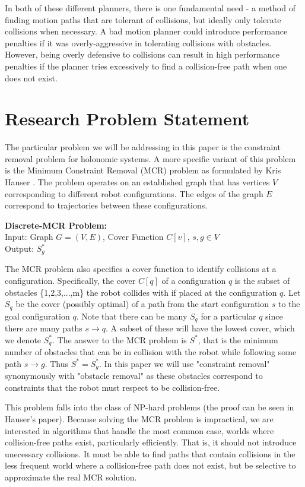In both of these different planners, there is one fundamental need - a method of finding motion paths that are tolerant of collisions, but ideally only tolerate collisions when necessary. A bad motion planner could introduce performance penalties if it was overly-aggressive in tolerating collisions with obstacles. However, being overly defensive to collisions can result in high performance penalties if the planner tries excessively to find a collision-free path when one does not exist. 

\section{Research Problem Statement} \label{intro:statement}
The particular problem we will be addressing in this paper is the constraint removal problem for holonomic systems. A more specific variant of this problem is the Minimum Constraint Removal (MCR) problem as formulated by Kris Hauser \cite{hauser:mcr}. The problem operates on an established graph that has vertices $V$ corresponding to different robot configurations. The edges of the graph $E$ correspond to trajectories between these configurations. 

\begin{mdframed}
{\bf{Discrete-MCR Problem:}}\\
Input: Graph $G = (V,E)$, Cover Function $C[v]$, $s,g \in V$  \\
Output: $S^{*}_g$
\end{mdframed}

The MCR problem also specifies a cover function to identify collisions at a configuration. Specifically, the cover $C[q]$ of a configuration $q$ is the subset of obstacles \{1,2,3,...,m\} the robot collides with if placed at the configuration $q$. Let $S_q$ be the cover (possibly optimal) of a path from the start configuration $s$ to the goal configuration $q$. Note that there can be many $S_q$ for a particular $q$ since there are many paths $s \rightarrow q$. A subset of these will have the lowest cover, which we denote $S^{*}_q$. The answer to the MCR problem is $S^{*}$, that is the minimum number of obstacles that can be in collision with the robot while following some path $s \rightarrow g$. Thus $S^{*} = S^{*}_g$. In this paper we will use "constraint removal" synonymously with "obstacle removal" as these obstacles correspond to constraints that the robot must respect to be collision-free.

This problem falls into the class of NP-hard problems (the proof can be seen in Hauser's paper). Because solving the MCR problem is impractical, we are interested in algorithms that handle the most common case, worlds where collision-free paths exist, particularly efficiently. That is, it should not introduce unecessary collisions. It must be able to find paths that contain collisions in the less frequent world where a collision-free path does not exist, but be selective to approximate the real MCR solution.

